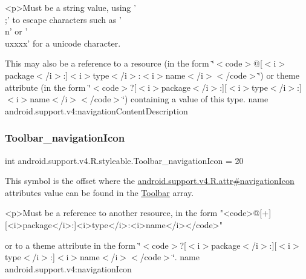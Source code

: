 \begin{DoxyVerb}      <p>Must be a string value, using '\\;' to escape characters such as '\\n' or '\\uxxxx' for a unicode character.
\end{DoxyVerb}
 

This may also be a reference to a resource (in the form \char`\"{}$<$code$>$@\mbox{[}$<$i$>$package$<$/i$>$\+:\mbox{]}$<$i$>$type$<$/i$>$\+:$<$i$>$name$<$/i$>$$<$/code$>$\char`\"{}) or theme attribute (in the form \char`\"{}$<$code$>$?\mbox{[}$<$i$>$package$<$/i$>$\+:\mbox{]}\mbox{[}$<$i$>$type$<$/i$>$\+:\mbox{]}$<$i$>$name$<$/i$>$$<$/code$>$\char`\"{}) containing a value of this type.  name android.\+support.\+v4\+:navigation\+Content\+Description \mbox{\label{classandroid_1_1support_1_1v4_1_1R_1_1styleable_a661ed648518af5edf2636cb075a4fbbe}} 
\subsubsection{\texorpdfstring{Toolbar\+\_\+navigation\+Icon}{Toolbar\_navigationIcon}}
{\footnotesize\ttfamily int android.\+support.\+v4.\+R.\+styleable.\+Toolbar\+\_\+navigation\+Icon = 20\hspace{0.3cm}{\ttfamily [static]}}

This symbol is the offset where the \hyperlink{classandroid_1_1support_1_1v4_1_1R_1_1attr_a2393d3f1cec603657e15756cff171b98}{android.\+support.\+v4.\+R.\+attr\#navigation\+Icon} attribute\textquotesingle{}s value can be found in the \hyperlink{classandroid_1_1support_1_1v4_1_1R_1_1styleable_a211358a2f951023c7735caea0fb5ae04}{Toolbar} array.

\begin{DoxyVerb}      <p>Must be a reference to another resource, in the form "<code>@[+][<i>package</i>:]<i>type</i>:<i>name</i></code>"
\end{DoxyVerb}
 or to a theme attribute in the form \char`\"{}$<$code$>$?\mbox{[}$<$i$>$package$<$/i$>$\+:\mbox{]}\mbox{[}$<$i$>$type$<$/i$>$\+:\mbox{]}$<$i$>$name$<$/i$>$$<$/code$>$\char`\"{}.  name android.\+support.\+v4\+:navigation\+Icon \mbox{\label{classandroid_1_1support_1_1v4_1_1R_1_1styleable_a6383da799d3eb15b2f73a0b40c936a2f}} 

